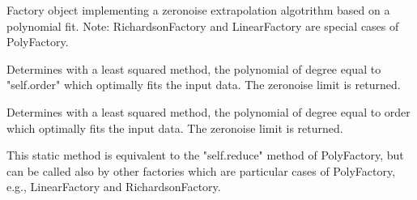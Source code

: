 \documentclass[letterpaper,10pt,english]{sphinxmanual}
\begin{document}

\begin{fulllineitems}
\label{\detokenize{apidoc:mitiq.factories.PolyFactory}}
Factory object implementing a zero\sphinxhyphen{}noise extrapolation algotrithm based on a polynomial fit.
Note: RichardsonFactory and LinearFactory are special cases of PolyFactory.

\begin{fulllineitems}
\label{\detokenize{apidoc:mitiq.factories.PolyFactory.reduce}}
Determines with a least squared method, the polynomial of degree equal to "self.order"
which optimally fits the input data. The zero\sphinxhyphen{}noise limit is returned.

\end{fulllineitems}


\begin{fulllineitems}
\label{\detokenize{apidoc:mitiq.factories.PolyFactory.static_reduce}}
Determines with a least squared method, the polynomial of degree equal to \textquotesingle{}order\textquotesingle{}
which optimally fits the input data. The zero\sphinxhyphen{}noise limit is returned.

This static method is equivalent to the "self.reduce" method of PolyFactory, but
can be called also by other factories which are particular cases of PolyFactory,
e.g., LinearFactory and RichardsonFactory.

\end{fulllineitems}


\end{fulllineitems}

\end{document}
